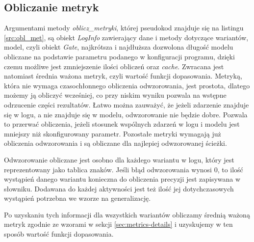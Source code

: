 \subsection{Obliczanie metryk}
Argumentami metody \textit{oblicz{\_}metryki}, której pseudokod znajduje się na listingu \ref{src:obl_met}, są obiekt \textit{LogInfo} zawierający dane i metody dotyczące wariantów, model, czyli obiekt \textit{Gate}, najkrótsza i najdłuższa dozwolona długość modelu obliczane na podstawie parametru podanego w konfiguracji programu, dzięki czemu możliwe jest zmniejszenie ilości obliczeń oraz \textit{cache}. Zwracana jest natomiast średnia ważona metryk, czyli wartość funkcji dopasowania. Metryką, która nie wymaga czasochłonnego obliczenia odwzorowania, jest prostota, dlatego możemy ją obliczyć wcześniej, co przy niskim wyniku pozwala na wstępne odrzucenie części rezultatów. Łatwo można zauważyć, że jeżeli zdarzenie znajduje się w logu, a nie znajduje się w modelu, odwzorowanie nie będzie dobre. Pozwala to przerwać obliczenia, jeżeli stosunek wspólnych zdarzeń w logu i modelu jest mniejszy niż skonfigurowany parametr. Pozostałe metryki wymagają już obliczenia odwzorowania i są obliczane dla najlepiej odwzorowanej ścieżki. 

Odwzorowanie obliczane jest osobno dla każdego wariantu w logu, który jest reprezentowany jako tablica znaków. Jeśli błąd odwzorowania wynosi 0, to ilość wystąpień danego wariantu konieczna do obliczenia precyzji jest zapisywana w słowniku. Dodawana do każdej aktywności jest też ilość jej dotychczasowych wystąpień potrzebna we wzorze na generalizację.

Po uzyskaniu tych informacji dla wszystkich wariantów obliczamy średnią ważoną metryk zgodnie ze wzorami w sekcji \ref{sec:metrics-details} i uzyskujemy w ten sposób wartość funkcji dopasowania.


